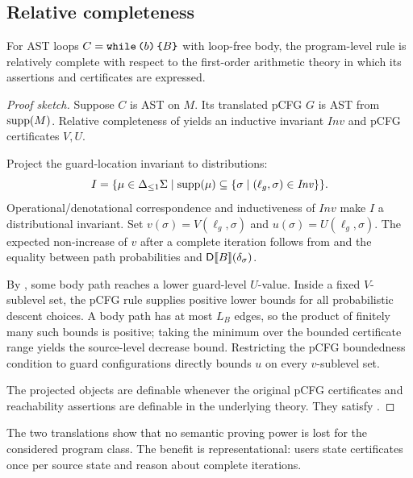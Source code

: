 \subsection{Relative completeness}

\begin{theorem}
\label{thm:complete}
For AST loops $C=\textnormal{\texttt{while}}\,\textnormal{\texttt{(}} b\textnormal{\texttt{)}}\,\textnormal{\texttt{\{}} B\textnormal{\texttt{\}}}$ with loop-free body, the program-level rule is relatively complete with respect to the first-order arithmetic theory in which its assertions and certificates are expressed.
\end{theorem}
\begin{proof}[Proof sketch]
Suppose $C$ is AST on $M$. Its translated pCFG $G$ is AST from $\textnormal{supp}(M)$. Relative completeness of  yields an inductive invariant $\mathit{Inv}$ and pCFG certificates $V,U$.

Project the guard-location invariant to distributions:
\[
 I=\{\mu\in{\Delta_{\leq 1}\Sigma}\mid
       \textnormal{supp}(\mu)\subseteq\{\sigma\mid(\ell_g,\sigma)\in\mathit{Inv}\}\}.
\]
Operational/denotational correspondence and inductiveness of $\mathit{Inv}$ make $I$ a distributional invariant. Set $v(\sigma)=V(\ell_g,\sigma)$ and $u(\sigma)=U(\ell_g,\sigma)$. The expected non-increase of $v$ after a complete iteration follows from  and the equality between path probabilities and $\mathsf{D}\llbracket B\rrbracket(\delta_{\sigma})$.

By , some body path reaches a lower guard-level $U$-value. Inside a fixed $V$-sublevel set, the pCFG rule supplies positive lower bounds for all probabilistic descent choices. A body path has at most $L_B$ edges, so the product of finitely many such bounds is positive; taking the minimum over the bounded certificate range yields the source-level decrease bound. Restricting the pCFG boundedness condition to guard configurations directly bounds $u$ on every $v$-sublevel set.

The projected objects are definable whenever the original pCFG certificates and reachability assertions are definable in the underlying theory. They satisfy .
\end{proof}

The two translations show that no semantic proving power is lost for the considered program class. The benefit is representational: users state certificates once per source state and reason about complete iterations.
